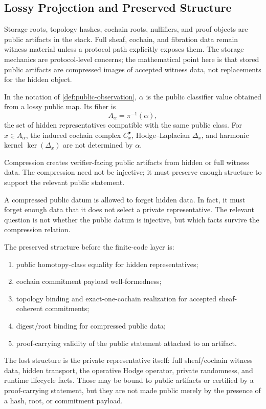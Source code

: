 \subsection{Lossy Projection and Preserved Structure}

Storage roots, topology hashes, cochain roots, nullifiers, and proof objects are
public artifacts in the stack. Full sheaf, cochain, and fibration data remain
witness material unless a protocol path explicitly exposes them. The storage
mechanics are protocol-level concerns; the mathematical point here is that
stored public artifacts are compressed images of accepted witness data, not
replacements for the hidden object.

In the notation of \cref{def:public-observation}, \(\alpha\) is the public
classifier value obtained from a lossy public map. Its fiber is
\[
  A_\alpha=\pi^{-1}(\alpha),
\]
the set of hidden representatives compatible with the same public class. For
\(x\in A_\alpha\), the induced cochain complex \(C_x^\bullet\),
Hodge--Laplacian \(\Delta_x\), and harmonic kernel \(\ker(\Delta_x)\) are not
determined by \(\alpha\).

Compression creates verifier-facing public artifacts from hidden or full
witness data. The compression need not be injective; it must preserve enough
structure to support the relevant public statement.

A compressed public datum is allowed to forget hidden data. In fact, it must
forget enough data that it does not select a private representative. The
relevant question is not whether the public datum is injective, but which facts
survive the compression relation.

The preserved structure before the finite-code layer is:
\begin{enumerate}[label=(\roman*)]
  \item public homotopy-class equality for hidden representatives;
  \item cochain commitment payload well-formedness;
  \item topology binding and exact-one-cochain realization for accepted
    sheaf-coherent commitments;
  \item digest/root binding for compressed public data;
  \item proof-carrying validity of the public statement attached to an artifact.
\end{enumerate}

The lost structure is the private representative itself: full sheaf/cochain
witness data, hidden transport, the operative Hodge operator, private
randomness, and runtime lifecycle facts. Those may be bound to public artifacts
or certified by a proof-carrying statement, but they are not made public merely
by the presence of a hash, root, or commitment payload.

